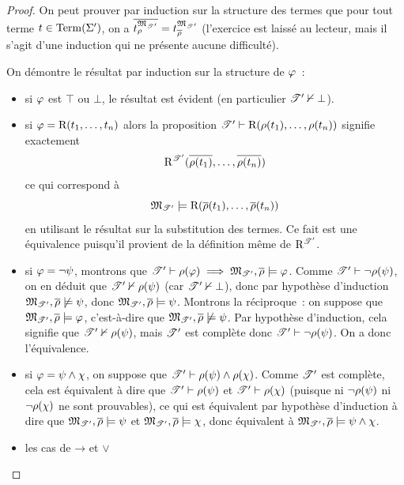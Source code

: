 \begin{proof}
  On peut prouver par induction sur la structure des termes que pour tout terme
  $t \in \operatorname{Term}(\Sigma')$, on a
  $\overline{t^{\mathfrak{M}_{\mathscr T'}}_{\rho}} =
  t^{\mathfrak{M}_{\mathscr T'}}_{\overline{\rho}}$
  (l'exercice est laissé au lecteur, mais il s'agit d'une induction qui ne
  présente aucune difficulté).
  
  On démontre le résultat par induction sur la structure de $\varphi$~:
  \begin{itemize}
  \item si $\varphi$ est $\top$ ou $\bot$, le résultat est évident (en
    particulier $\mathscr T'\nvdash\bot$).
  \item si $\varphi = \mathrm{R}(t_1,\ldots,t_n)$ alors la proposition
    $\mathscr T'\vdash \mathrm{R}(\rho(t_1),\ldots,\rho(t_n))$ signifie
    exactement
    \[\mathrm{R}^{\mathscr T'}(\overline{\rho(t_1)},\ldots,\overline{\rho(t_n)})\]
    ce qui correspond à
    \[\mathfrak{M}_{\mathscr T'}\models \mathrm{R}(\overline{\rho} (t_1),\ldots,\overline{\rho}(t_n))\]
    en utilisant le résultat sur la substitution des termes.
    Ce fait est une équivalence puisqu'il provient de la définition même de
    $\mathrm{R}^{\mathscr T'}$.
  \item si $\varphi = \lnot \psi$, montrons que
    $\mathscr T'\vdash\rho(\varphi)\implies \mathfrak{M}_{\mathscr T'},
    \overline{\rho} \models\varphi$.
    Comme $\mathscr T'\vdash \lnot \rho(\psi)$, on en déduit que
    $\mathscr T'\nvdash \rho(\psi)$ (car $\mathscr T'\nvdash\bot$), donc par
    hypothèse d'induction
    $\mathfrak{M}_{\mathscr T'},\overline{\rho}\not\models \psi$, donc
    $\mathfrak{M}_{\mathscr T'},\overline{\rho}\models \psi$.
    Montrons la réciproque~: on suppose que
    $\mathfrak{M}_{\mathscr T'},\overline{\rho}\models \varphi$, c'est-à-dire que
    $\mathfrak{M}_{\mathscr T'},\overline{\rho}\not\models \psi$. Par hypothèse
    d'induction, cela signifie que $\mathscr T'\nvdash \rho(\psi)$, mais
    $\mathscr T'$ est complète donc $\mathscr T'\vdash\lnot\rho(\psi)$. On a
    donc l'équivalence.
  \item si $\varphi = \psi \land \chi$, on suppose que
    $\mathscr T'\vdash \rho(\psi)\land\rho(\chi)$. Comme $\mathscr T'$ est
    complète, cela est équivalent à dire que $\mathscr T'\vdash \rho(\psi)$ et
    $\mathscr T'\vdash \rho(\chi)$ (puisque ni $\lnot\rho(\psi)$ ni
    $\lnot \rho(\chi)$ ne sont prouvables), ce qui est équivalent par
    hypothèse d'induction à dire que
    $\mathfrak{M}_{\mathscr T'},\overline{\rho}\models\psi$ et
    $\mathfrak{M}_{\mathscr T'},\overline{\rho}\models\chi$, donc équivalent à
    $\mathfrak{M}_{\mathscr T'},\overline{\rho}\models \psi\land \chi$.
  \item les cas de $\mathord{\to}$ et $\mathord{\lor}$

\end{itemize}
\end{proof}
